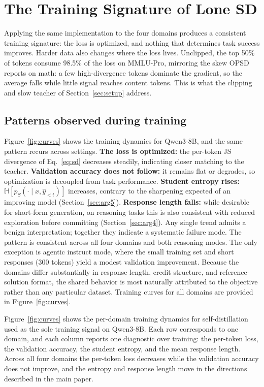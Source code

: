 \documentclass{article}
\begin{document}
\section{The Training Signature of Lone SD }
\label{sec:signature}
Applying the same implementation to the four domains produces a consistent training signature: the loss is optimized, and nothing that determines task success improves. Harder data also changes where the loss lives. Unclipped, the top 50\% of tokens consume 98.5\% of the loss on MMLU-Pro, mirroring the skew OPSD \citep{opsd2025} reports on math: a few high-divergence tokens dominate the gradient, so the average falls while little signal reaches content tokens. This is what the clipping and slow teacher of Section~\ref{sec:setup} address.

\subsection{Patterns observed during training}
\label{sec:diagnostics}

Figure~\ref{fig:curves} shows the training dynamics for Qwen3-8B, and the same pattern recurs across settings. \textbf{The loss is optimized:} the per-token JS divergence of Eq.~\eqref{eq:sd} decreases steadily, indicating closer matching to the teacher. \textbf{Validation accuracy does not follow:} it remains flat or degrades, so optimization is decoupled from task performance. \textbf{Student entropy rises:} $\mathbb{H}[p_S(\cdot\mid x,\hat y_{<t})]$ increases, contrary to the sharpening expected of an improving model (Section~\ref{sec:arg5}). \textbf{Response length falls:} while desirable for short-form generation, on reasoning tasks this is also consistent with reduced exploration before committing (Section~\ref{sec:arg4}). Any single trend admits a benign interpretation; together they indicate a systematic failure mode. The pattern is consistent across all four domains and both reasoning modes. The only exception is agentic instruct mode, where the small training set and short responses (300 tokens) yield a modest validation improvement. Because the domains differ substantially in response length, credit structure, and reference-solution format, the shared behavior is most naturally attributed to the objective rather than any particular dataset. Training curves for all domains are provided in Figure~\ref{fig:curves}.

Figure~\ref{fig:curves} shows the per-domain training dynamics for
self-distillation used as the sole training signal on Qwen3-8B. Each row
corresponds to one domain, and each column reports one diagnostic over training:
the per-token loss, the validation accuracy, the student entropy, and the mean
response length. Across all four domains the per-token loss decreases while the
validation accuracy does not improve, and the entropy and response length move
in the directions described in the main paper.
\end{document}
